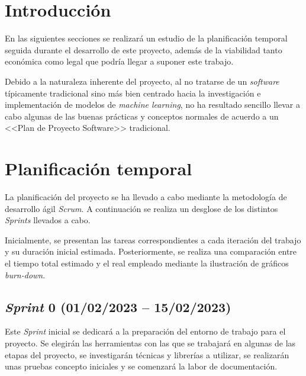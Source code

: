  \label{section:project_plan}

\section{Introducción}

En las siguientes secciones se realizará un estudio de la planificación temporal seguida durante el desarrollo de este proyecto, además de la viabilidad tanto económica como legal que podría llegar a suponer este trabajo.

Debido a la naturaleza inherente del proyecto, al no tratarse de un \textit{software} típicamente tradicional sino más bien centrado hacia la investigación e implementación de modelos de \textit{machine learning}, no ha resultado sencillo llevar a cabo algunas de las buenas prácticas y conceptos normales de acuerdo a un <<Plan de Proyecto Software>> tradicional.

\section{Planificación temporal} \label{section:planification}

La planificación del proyecto se ha llevado a cabo mediante la metodología de desarrollo ágil \textit{Scrum}. A continuación se realiza un desglose de los distintos \textit{Sprints} llevados a cabo.

Inicialmente, se presentan las tareas correspondientes a cada iteración del trabajo y su duración inicial estimada. Posteriormente, se realiza una comparación entre el tiempo total estimado y el real empleado mediante la ilustración de gráficos \textit{burn-down}.

\subsection{\textit{Sprint} 0 (01/02/2023 -- 15/02/2023)}

Este \textit{Sprint} inicial se dedicará a la preparación del entorno de trabajo para el proyecto. Se elegirán las herramientas con las que se trabajará en algunas de las etapas del proyecto, se investigarán técnicas y librerías a utilizar, se realizarán unas pruebas concepto iniciales y se comenzará la labor de documentación.

